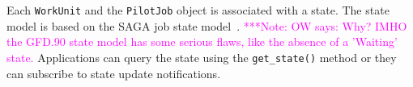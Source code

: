 \documentclass[conference,final]{IEEEtran}
\newcommand{\alnote}[1]{ {\textcolor{blue} { ***andre: #1 }}}
\newcommand{\note}[1]{ {\textcolor{magenta} { ***Note: #1 }}}
\newcommand{\alnote}[1]{}
\newcommand{\note}[1]{}
\begin{document}


Each \texttt{WorkUnit} and the \texttt{PilotJob} object is associated with a
state. The state model is based on the SAGA job state model~\cite{saga_gfd90}.
\note{OW says: Why? IMHO the GFD.90 state model has some serious flaws, like
the absence of a 'Waiting' state.} 
Applications can query the state using the \texttt{get\_state()} method or they
can subscribe to state update notifications.


\end{document}
